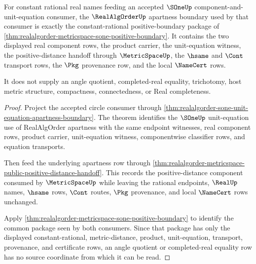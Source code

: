 \begin{theorem}
\label{thm:realalgorder-constant-apartness-sone-unit-boundary}
For constant rational real names feeding an accepted $\SOneUp$
component-and-unit-equation consumer, the $\RealAlgOrderUp$ apartness boundary
used by that consumer is exactly the constant-rational positive-boundary
package of \autoref{thm:realalgorder-metricspace-sone-positive-boundary}. It
contains the two displayed real component rows, the product carrier, the
unit-equation witness, the positive-distance handoff through $\MetricSpaceUp$,
the $\hsame$ and $\Cont$ transport rows, the $\Pkg$ provenance row, and the
local $\NameCert$ rows.

It does not supply an angle quotient, completed-real equality, trichotomy,
host metric structure, compactness, connectedness, or Real completeness.
\end{theorem}
\begin{proof}
Project the accepted circle consumer through
\autoref{thm:realalgorder-sone-unit-equation-apartness-boundary}. The theorem
identifies the $\SOneUp$ unit-equation use of RealAlgOrder apartness with the
same endpoint witnesses, real component rows, product carrier, unit-equation
witness, componentwise classifier rows, and equation transports.

Then feed the underlying apartness row through
\autoref{thm:realalgorder-metricspace-public-positive-distance-handoff}. This
records the positive-distance component consumed by $\MetricSpaceUp$ while
leaving the rational endpoints, $\RealUp$ names, $\hsame$ rows, $\Cont$ routes,
$\Pkg$ provenance, and local $\NameCert$ rows unchanged.

Apply
\autoref{thm:realalgorder-metricspace-sone-positive-boundary} to identify the
common package seen by both consumers. Since that package has only the displayed
constant-rational, metric-distance, product, unit-equation, transport,
provenance, and certificate rows, an angle quotient or completed-real equality
row has no source coordinate from which it can be read.
\end{proof}

